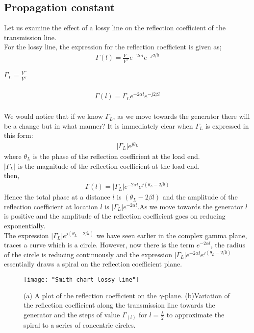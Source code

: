 \subsection{Propagation constant}
Let us examine the effect of a lossy line on the reflection coefficient of the transmission line.
    \\For the lossy line, the expression for the reflection coefficient is given as;
    \begin{align*}
    \Gamma{(l)} = \frac{V^-}{V^+}e^{-2\alpha l}e^{-j2\beta l}
    \end{align*}
    \begin{center}
    	 $\Gamma_L =\frac{V^-}{V^+}$
    \end{center}
    \begin{align*} 
    \\\Gamma{(l)} = \Gamma_Le^{-2\alpha l}e^{-j2\beta l}
    \end{align*}
     \\We would notice that if we know $\Gamma_L$, as we move towards the generator there will be a change but in what manner? It is immediately clear when $\Gamma_L$ is expressed in this form:
    \begin{align*}
    |\Gamma_L |e^{j\theta_L}
    \end{align*}
    where $\theta_L$ is the phase of the reflection coefficient at the load end.
    \\$|\Gamma_L|$ is the magnitude of the reflection coefficient at the load end.\\
    then,
    \begin{align*}
    \Gamma{(l)} = |\Gamma_L|e^{-2\alpha l}e^{j(\theta_L-2\beta l)}
    \end{align*}
    Hence the total phase at a distance $l$ is $(\theta_L - 2\beta l)$ and the amplitude of the reflection coefficient at location $l$ is $|\Gamma_L|e^{-2\alpha l}$.As we move towards the generator $l$ is positive and the amplitude of the reflection coefficient goes on reducing exponentially.\\
    
    The expression $|\Gamma_L|e^{j(\theta_L-2\beta l)}$ we have seen earlier in the complex gamma plane, traces a curve which is a circle. However, now there is the term $e^{-2\alpha l}$, the radius of the circle is reducing continuously and the expression $|\Gamma_L|e^{-2\alpha l}e^{j(\theta_L - 2\beta l)}$ essentially draws a spiral on the reflection coefficient plane.
  \begin{figure}[h]
  	\centering
  	\texttt{[image: "Smith chart lossy line"]}
  	\caption{(a) A plot of the reflection coefficient on the $\gamma$-plane. (b)Variation of the reflection coefficient along the transmission line towards the generator and the steps of value $\Gamma_{(l)}$ for $l = \frac{\lambda}{2}$ to approximate the spiral to a series of concentric circles.}
  \end{figure}
  
